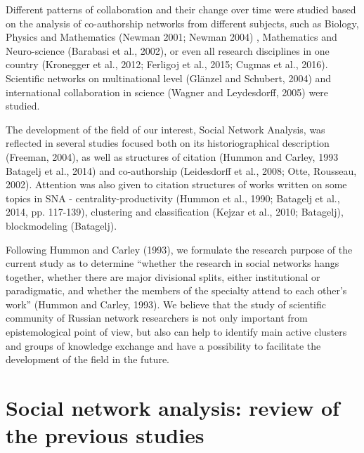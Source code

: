 \documentclass[11pt]{article} %
\newcommand{\Remark}[1]{\ifodd\value{page} \normalmarginpar
 \else \reversemarginpar \fi \marginpar{{\footnotesize #1}} }
\begin{document}
Different patterns of collaboration and their change over time were studied based on the analysis of co-authorship networks from different subjects, such as Biology, Physics and Mathematics (Newman 2001; Newman 2004)  , Mathematics and Neuro-science (Barabasi et al., 2002), or even all research disciplines in one country (Kronegger et al., 2012; Ferligoj et al., 2015; Cugmas et al., 2016). Scientific networks on multinational level (Glänzel and Schubert, 2004) and international collaboration in science (Wagner and Leydesdorff, 2005) were studied.  \medskip 

The development of the field of our interest, Social Network Analysis, was reflected in several studies focused both on its historiographical description (Freeman, 2004), as well as structures of citation (Hummon and Carley, 1993 Batagelj et al., 2014) and co-authorship (Leidesdorff et al., 2008; Otte, Rousseau, 2002). Attention was also given to citation structures of works written on some topics in SNA - centrality-productivity (Hummon et al., 1990; Batagelj et al., 2014, pp. 117-139), clustering and classification (Kejzar et al., 2010; Batagelj), blockmodeling (Batagelj). \medskip 

Following Hummon and Carley (1993), we formulate the research purpose of the current study as to determine “whether the research in social networks hangs together, whether there are major divisional splits, either institutional or paradigmatic, and whether the members of the specialty attend to each other’s work” (Hummon and Carley, 1993). We believe that the study of scientific community of Russian\Remark{Russian???} network researchers is not only important from epistemological point of view, but also can help to identify main active clusters and groups of knowledge exchange and have a possibility to facilitate the development of the field in the future.  \medskip  

\section{Social network analysis: review of the previous studies}
\end{document}
